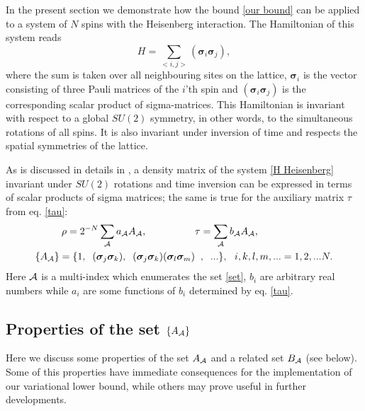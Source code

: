 \documentclass[a4paper]{jpconf}
\renewcommand\[{\begin{equation}}
\renewcommand\]{\end{equation}}
\newcommand{\ssigma}{{\bm \sigma}}
\newcommand{\A}{{\cal A}}
\begin{document}
In the present section we demonstrate how the bound \eqref{our bound} can be applied to  a system of $N$ spins with the Heisenberg interaction. The Hamiltonian of this system reads
%
\begin{equation}\label{H Heisenberg}
	H = \sum_{<i,j>} \left( {{{\bm \ssigma}_i}{{\bm \ssigma}_j}} \right) ,
\end{equation}
where  the sum is taken over all neighbouring sites on the lattice, ${\bm \ssigma}_i$ is the vector consisting of three Pauli matrices of the $i$'th spin and $\left( {{{\bm \ssigma}_i}{{\bm \ssigma}_j}} \right)$ is the corresponding scalar product of sigma-matrices. This Hamiltonian is invariant with respect to a global $SU(2)$ symmetry, in other words, to the simultaneous rotations of all spins. It is also invariant under inversion of time and respects the spatial symmetries of the lattice.

As is discussed in details in \cite{SqParam,Shpagina}, a density matrix of the system \eqref{H Heisenberg} invariant under $SU(2)$ rotations and time inversion  can be expressed in terms of scalar products of sigma matrices; the same is true for  the auxiliary matrix  $\tau$ from eq. \eqref{tau}:
\def\arraystretch{1.8}
\begin{align}
\rho  = 2^{-N} \sum_\A a_\A A_\A,\qquad \qquad  &\tau  = \sum_\A b_\A A_\A,
\\
\{ A_\A \}  = \{ 1,  \;\;({\bf \ssigma}_j{\bf\ssigma}_k), \;\;
({\bf \ssigma}_j{\bf\ssigma}_k)({\bf \ssigma}_l{\bf\ssigma}_m) & \;\;,\;\;...\},~~i,k,l,m,...=1,2,...N.\label{set}
\end{align}
Here $\A$ is a multi-index which enumerates the set \eqref{set}, $b_i$ are arbitrary real numbers while $a_i$ are some functions of $b_i$ determined by eq. \eqref{tau}.

\subsection{Properties  of the set $\{A_\A\}$}
Here we discuss some properties  of the set $A_\A$ and a related set  $B_\A$ (see below). Some of this properties have immediate consequences for the implementation of our variational lower bound, while others may prove useful in further developments.
\end{document}

